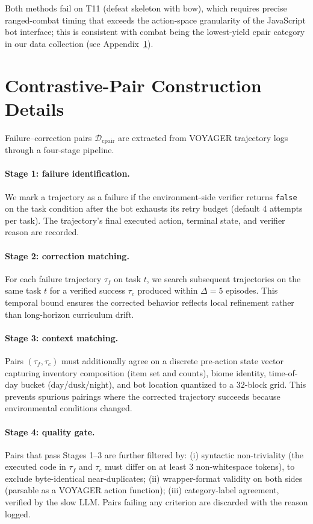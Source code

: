 \documentclass[11pt]{article}
\begin{document}
Both methods fail on T11 (defeat skeleton with bow), which
requires precise ranged-combat timing that exceeds the
action-space granularity of the JavaScript bot interface;
this is consistent with combat being the lowest-yield cpair
category in our data collection (see Appendix~\ref{app:cpair}).

\section{Contrastive-Pair Construction Details}
\label{app:cpair}

Failure--correction pairs $\mathcal{D}_{\text{cpair}}$ are
extracted from VOYAGER trajectory logs through a four-stage
pipeline.

\paragraph{Stage 1: failure identification.} We mark a
trajectory as a failure if the environment-side verifier
returns \texttt{false} on the task condition after the bot
exhausts its retry budget (default 4 attempts per task).
The trajectory's final executed action, terminal state, and
verifier reason are recorded.

\paragraph{Stage 2: correction matching.} For each failure
trajectory $\tau_f$ on task $t$, we search subsequent
trajectories on the same task $t$ for a verified success
$\tau_c$ produced within $\Delta = 5$ episodes.       %
This temporal bound ensures the corrected behavior reflects
local refinement rather than long-horizon curriculum drift.

\paragraph{Stage 3: context matching.} Pairs $(\tau_f,
\tau_c)$ must additionally agree on a discrete pre-action
state vector capturing inventory composition (item set and
counts), biome identity, time-of-day bucket (day/dusk/night),
and bot location quantized to a $32$-block grid.       %
This prevents spurious pairings where the corrected
trajectory succeeds because environmental conditions
changed.

\paragraph{Stage 4: quality gate.} Pairs that pass Stages
1--3 are further filtered by:
(i) syntactic non-triviality (the executed code in $\tau_f$
and $\tau_c$ must differ on at least 3 non-whitespace
tokens), to exclude byte-identical near-duplicates;
(ii) wrapper-format validity on both sides (parsable as a
VOYAGER action function);
(iii) category-label agreement, verified by the slow LLM.
Pairs failing any criterion are discarded with the reason
logged.
\end{document}

